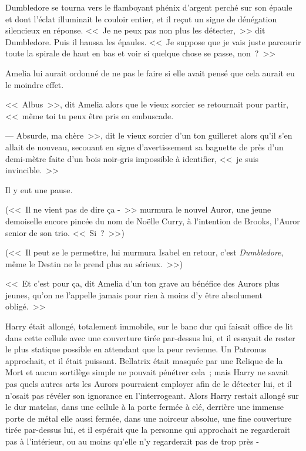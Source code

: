Dumbledore se tourna vers le flamboyant phénix d'argent perché sur son épaule et dont l'éclat illuminait le couloir entier, et il reçut un signe de dénégation silencieux en réponse. <<~Je ne peux pas non plus les détecter,~>> dit Dumbledore. Puis il haussa les épaules. <<~Je suppose que je vais juste parcourir toute la spirale de haut en bas et voir si quelque chose se passe, non~?~>>

Amelia lui aurait ordonné de ne pas le faire si elle avait pensé que cela aurait eu le moindre effet.

<<~Albus~>>, dit Amelia alors que le vieux sorcier se retournait pour partir, <<~même toi tu peux être pris en embuscade.

--- Absurde, ma chère~>>, dit le vieux sorcier d'un ton guilleret alors qu'il s'en allait de nouveau, secouant en signe d'avertissement sa baguette de près d'un demi-mètre faite d'un bois noir-gris impossible à identifier, <<~je suis invincible.~>>

Il y eut une pause.

(<<~Il ne vient pas de dire ça -~>> murmura le nouvel Auror, une jeune demoiselle encore pincée du nom de Noëlle Curry, à l'intention de Brooks, l'Auror senior de son trio. <<~Si~?~>>)

(<<~Il peut se le permettre, lui murmura Isabel en retour, c'est \emph{Dumbledore}, même le Destin ne le prend plus au sérieux.~>>)

<<~Et c'est pour ça, dit Amelia d'un ton grave au bénéfice des Aurors plus jeunes, qu'on ne l'appelle jamais pour rien à moins d'y être absolument obligé.~>>

\later

Harry était allongé, totalement immobile, sur le banc dur qui faisait office de lit dans cette cellule avec une couverture tirée par-dessus lui, et il essayait de rester le plus statique possible en attendant que la peur revienne. Un Patronus approchait, et il était puissant. Bellatrix était masquée par une Relique de la Mort et aucun sortilège simple ne pouvait pénétrer cela~; mais Harry ne savait pas quels autres arts les Aurors pourraient employer afin de le détecter lui, et il n'osait pas révéler son ignorance en l'interrogeant. Alors Harry restait allongé sur le dur matelas, dans une cellule à la porte fermée à clé, derrière une immense porte de métal elle aussi fermée, dans une noirceur absolue, une fine couverture tirée par-dessus lui, et il espérait que la personne qui approchait ne regarderait pas à l'intérieur, ou au moins qu'elle n'y regarderait pas de trop près -

